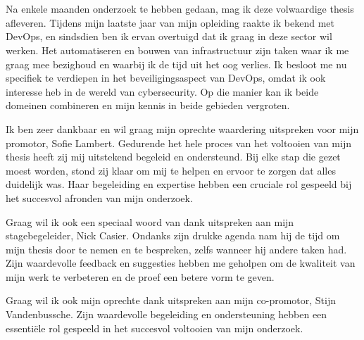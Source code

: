 
\chapter*{}%
\label{ch:voorwoord}


Na enkele maanden onderzoek te hebben gedaan, mag ik deze volwaardige thesis afleveren. Tijdens mijn laatste jaar van mijn opleiding raakte ik bekend met DevOps, en sindsdien ben ik ervan overtuigd dat ik graag in deze sector wil werken. Het automatiseren en bouwen van infrastructuur zijn taken waar ik me graag mee bezighoud en waarbij ik de tijd uit het oog verlies. Ik besloot me nu specifiek te verdiepen in het beveiligingsaspect van DevOps, omdat ik ook interesse heb in de wereld van cybersecurity. Op die manier kan ik beide domeinen combineren en mijn kennis in beide gebieden vergroten.
\newline

Ik ben zeer dankbaar en wil graag mijn oprechte waardering uitspreken voor mijn promotor, Sofie Lambert. Gedurende het hele proces van het voltooien van mijn thesis heeft zij mij uitstekend begeleid en ondersteund. Bij elke stap die gezet moest worden, stond zij klaar om mij te helpen en ervoor te zorgen dat alles duidelijk was. Haar begeleiding en expertise hebben een cruciale rol gespeeld bij het succesvol afronden van mijn onderzoek.
\newline

Graag wil ik ook een speciaal woord van dank uitspreken aan mijn stagebegeleider, Nick Casier. Ondanks zijn drukke agenda nam hij de tijd om mijn thesis door te nemen en te bespreken, zelfs wanneer hij andere taken had. Zijn waardevolle feedback en suggesties hebben me geholpen om de kwaliteit van mijn werk te verbeteren en de proef een betere vorm te geven. 
\newline

Graag wil ik ook mijn oprechte dank uitspreken aan mijn co-promotor, Stijn Vandenbussche. Zijn waardevolle begeleiding en ondersteuning hebben een \mbox{essentiële} rol gespeeld in het succesvol voltooien van mijn onderzoek.
\newline

